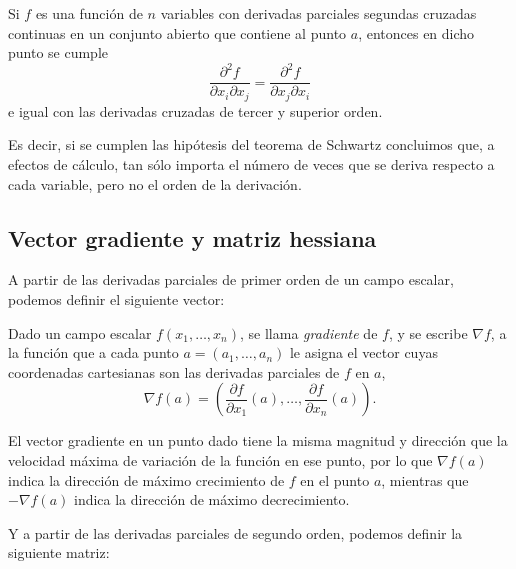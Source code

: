 \begin{teorema}[Schwartz]
Si $f$ es una función de $n$ variables con derivadas parciales segundas cruzadas continuas en un conjunto abierto que
contiene al punto $a$, entonces en dicho punto se cumple
\[
\frac{\partial ^2 f}{\partial x_i \partial x_j } = \frac{\partial ^2 f}{\partial x_j \partial x_i }
\] 
e igual con las derivadas cruzadas de tercer y superior orden.
\end{teorema}

Es decir, si se cumplen las hipótesis del teorema de Schwartz concluimos que, a efectos de cálculo, tan sólo importa el
número de veces que se deriva respecto a cada variable, pero no el orden de la derivación.

\subsection{Vector gradiente y matriz hessiana}
A partir de las derivadas parciales de primer orden de un campo escalar, podemos definir el siguiente vector:

\begin{definicion}
Dado un campo escalar $f(x_1,\ldots,x_n)$, se llama \emph{gradiente} de $f$, y se escribe $\nabla f$, a la función que a
cada punto $a=(a_1,\ldots,a_n)$ le asigna el vector cuyas coordenadas cartesianas son las derivadas parciales de $f$ en
$a$,
\[
\nabla f(a)=\left(\frac{\partial f}{\partial x_1}(a),\ldots,\frac{\partial f}{\partial x_n}(a)\right).
\]
\end{definicion}

El vector gradiente en un punto dado tiene la misma magnitud y dirección que la velocidad máxima de variación de la
función en ese punto, por lo que $\nabla f(a)$ indica la dirección de máximo crecimiento de $f$ en el punto $a$,
mientras que $-\nabla f(a)$ indica la dirección de máximo decrecimiento.

Y a partir de las derivadas parciales de segundo orden, podemos definir la siguiente matriz:


